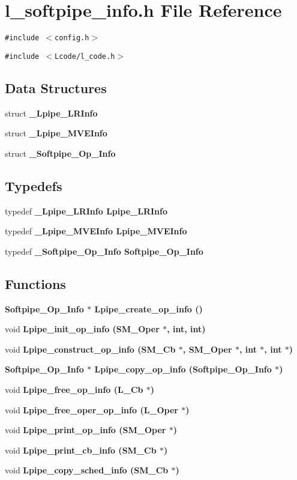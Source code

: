 \section{l\_\-softpipe\_\-info.h File Reference}
\label{l__softpipe__info_8h}
{\tt \#include $<$config.h$>$}\par
{\tt \#include $<$Lcode/l\_\-code.h$>$}\par
\subsection*{Data Structures}
\begin{CompactItemize}
\item 
struct \bf{\_\-Lpipe\_\-LRInfo}
\item 
struct \bf{\_\-Lpipe\_\-MVEInfo}
\item 
struct \bf{\_\-Softpipe\_\-Op\_\-Info}
\end{CompactItemize}
\subsection*{Typedefs}
\begin{CompactItemize}
\item 
typedef \bf{\_\-Lpipe\_\-LRInfo} \bf{Lpipe\_\-LRInfo}
\item 
typedef \bf{\_\-Lpipe\_\-MVEInfo} \bf{Lpipe\_\-MVEInfo}
\item 
typedef \bf{\_\-Softpipe\_\-Op\_\-Info} \bf{Softpipe\_\-Op\_\-Info}
\end{CompactItemize}
\subsection*{Functions}
\begin{CompactItemize}
\item 
\bf{Softpipe\_\-Op\_\-Info} $\ast$ \bf{Lpipe\_\-create\_\-op\_\-info} ()
\item 
void \bf{Lpipe\_\-init\_\-op\_\-info} (\bf{SM\_\-Oper} $\ast$, int, int)
\item 
void \bf{Lpipe\_\-construct\_\-op\_\-info} (\bf{SM\_\-Cb} $\ast$, \bf{SM\_\-Oper} $\ast$, int $\ast$, int $\ast$)
\item 
\bf{Softpipe\_\-Op\_\-Info} $\ast$ \bf{Lpipe\_\-copy\_\-op\_\-info} (\bf{Softpipe\_\-Op\_\-Info} $\ast$)
\item 
void \bf{Lpipe\_\-free\_\-op\_\-info} (L\_\-Cb $\ast$)
\item 
void \bf{Lpipe\_\-free\_\-oper\_\-op\_\-info} (L\_\-Oper $\ast$)
\item 
void \bf{Lpipe\_\-print\_\-op\_\-info} (\bf{SM\_\-Oper} $\ast$)
\item 
void \bf{Lpipe\_\-print\_\-cb\_\-info} (\bf{SM\_\-Cb} $\ast$)
\item 
void \bf{Lpipe\_\-copy\_\-sched\_\-info} (\bf{SM\_\-Cb} $\ast$)
\end{CompactItemize}
